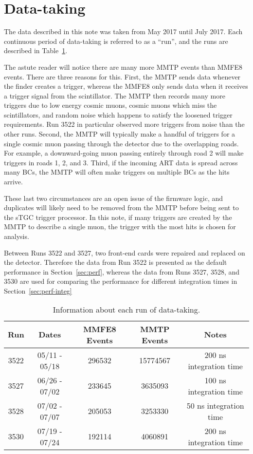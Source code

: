 \section{Data-taking}
\label{sec:data-taking}

The data described in this note was taken from May 2017 until July 2017. Each continuous period of data-taking is referred to as a ``run'', and the runs are described in Table~\ref{tab:runs}. 

The astute reader will notice there are many more MMTP events than MMFE8 events. There are three reasons for this. First, the MMTP sends data whenever the finder creates a trigger, whereas the MMFE8 only sends data when it receives a trigger signal from the scintillator. The MMTP then records many more triggers due to low energy cosmic muons, cosmic muons which miss the scintillators, and random noise which happens to satisfy the loosened trigger requirements. Run 3522 in particular observed more triggers from noise than the other runs. Second, the MMTP will typically make a handful of triggers for a single cosmic muon passing through the detector due to the overlapping roads. For example, a downward-going muon passing entirely through road 2 will make triggers in roads 1, 2, and 3. Third, if the incoming ART data is spread across many BCs, the MMTP will often make triggers on multiple BCs as the hits arrive. 

These last two circumstances are an open issue of the firmware logic, and duplicates will likely need to be removed from the MMTP before being sent to the sTGC trigger processor. In this note, if many triggers are created by the MMTP to describe a single muon, the trigger with the most hits is chosen for analysis.

Between Runs 3522 and 3527, two front-end cards were repaired and replaced on the detector. Therefore the data from Run 3522 is presented as the default performance in Section~\ref{sec:perf}, whereas the data from Runs 3527, 3528, and 3530 are used for comparing the performance for different integration times in Section~\ref{sec:perf-integ}

\begin{table}[!htpb]
\begin{center}
  \begin{tabular}{c | c | c | c | c}
    Run  & Dates         & MMFE8 Events & MMTP Events & Notes \\
    \hline
    3522 & 05/11 - 05/18 & 296532       & 15774567    & 200 ns integration time \\
    3527 & 06/26 - 07/02 & 233645       & 3635093     & 100 ns integration time \\
    3528 & 07/02 - 07/07 & 205053       & 3253330     & 50 ns integration time \\
    3530 & 07/19 - 07/24 & 192114       & 4060891     & 200 ns integration time \\
  \end{tabular}
  \caption{Information about each run of data-taking.}
\label{tab:runs}
\end{center}
\end{table}

